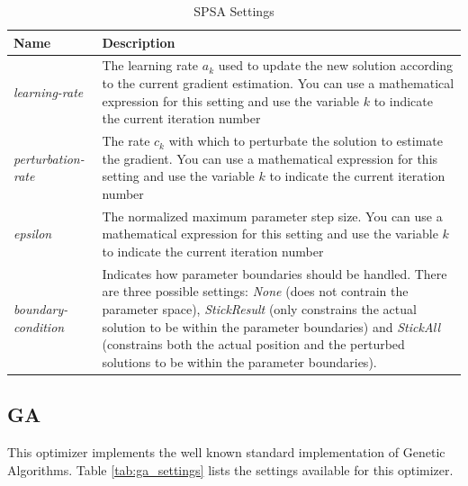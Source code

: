 \documentclass{report}
\begin{document}
\begin{table}[h!tb]\caption{SPSA Settings}\label{tab:spsa_settings}\vspace{0.1in}
	\centering

	\begin{tabular}{p{4cm} p{12cm}}
		\toprule
		\textbf{Name} & \textbf{Description} \\
		\midrule
		\textit{learning-rate} & The learning rate $a_k$ used to update the
		                         new solution according to the current gradient
		                         estimation. You can use a mathematical
		                         expression for this setting and use the
		                         variable $k$ to indicate the current iteration
		                         number \\
		\textit{perturbation-rate} & The rate $c_k$ with which to perturbate the
		                             solution to estimate the gradient. You
		                             can use a mathematical expression for this
		                             setting and use the variable $k$ to
		                             indicate the current iteration number \\
		\textit{epsilon} & The normalized maximum parameter step size. You
		                    can use a mathematical expression for this
		                    setting and use the variable $k$ to indicate the
		                    current iteration number \\
		\textit{boundary-condition} & Indicates how parameter boundaries
		                              should be handled. There are three
		                              possible settings: \textit{None}
		                              (does not contrain the parameter
		                              space), \textit{StickResult} (only
		                              constrains the actual solution to
		                              be within the parameter boundaries)
		                              and \textit{StickAll} (constrains
		                              both the actual position and the
		                              perturbed solutions to be within
		                              the parameter boundaries). \\
		\bottomrule
	\end{tabular}
\end{table}

\newpage

\subsection{GA}
This optimizer implements the well known standard implementation of
Genetic Algorithms. Table \ref{tab:ga_settings} lists the settings available
for this optimizer.
\end{document}
